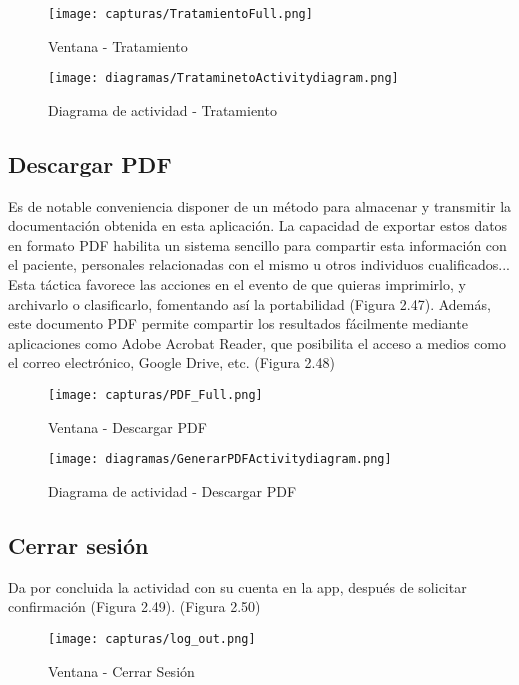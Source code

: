 \documentclass[11pt,spanish,
		listoftables,listoffigures]
		{tfgplantilla}
\begin{document}
\begin{figure}[H]
\centering
\texttt{[image: capturas/TratamientoFull.png]}
\caption{Ventana - Tratamiento}
\end{figure}

\begin{figure}[H]
\centering
\texttt{[image: diagramas/TrataminetoActivitydiagram.png]}
\caption{Diagrama de actividad - Tratamiento}
\end{figure}

\subsection {Descargar PDF}

Es de notable conveniencia disponer de un método para almacenar y transmitir la documentación obtenida en esta aplicación. La capacidad de exportar estos datos en formato PDF habilita un sistema sencillo para compartir esta información con el paciente, personales relacionadas con el mismo u otros individuos cualificados...  Esta táctica favorece las acciones en el evento de que quieras imprimirlo, y archivarlo o clasificarlo, fomentando así la portabilidad (Figura 2.47). Además, este documento PDF permite compartir los resultados fácilmente mediante aplicaciones como Adobe Acrobat Reader, que posibilita el acceso a medios como el correo electrónico, Google Drive, etc. (Figura 2.48)

\begin{figure}[H]
\centering
\texttt{[image: capturas/PDF\_Full.png]}
\caption{Ventana - Descargar PDF}
\end{figure}

\begin{figure}[H]
\centering
\texttt{[image: diagramas/GenerarPDFActivitydiagram.png]}
\caption{Diagrama de actividad - Descargar PDF}
\end{figure}

\newpage
\subsection {Cerrar sesión}

Da por concluida la actividad con su cuenta en la app, después de solicitar confirmación (Figura 2.49). (Figura 2.50)

\begin{figure}[H]
\centering
\texttt{[image: capturas/log\_out.png]}
\caption{Ventana - Cerrar Sesión}
\end{figure}
\end{document}
